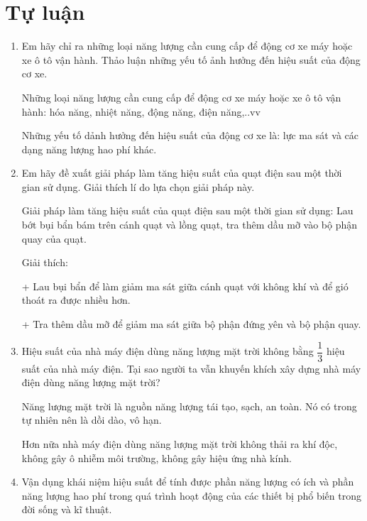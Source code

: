 \section{Tự luận}
\begin{enumerate}[label=\bfseries Câu \arabic*:]
		\item {}
	
	
	{
		Em hãy chỉ ra những loại năng lượng cần cung cấp để động cơ xe máy hoặc xe ô tô vận hành. Thảo luận những yếu tố ảnh hưởng đến hiệu suất của động cơ xe.
	}
	
	\hideall
	{	
		Những loại năng lượng cần cung cấp để động cơ xe máy hoặc xe ô tô vận hành: hóa năng, nhiệt năng, động năng, điện năng,..vv 
		
		Những yếu tố dảnh hưởng đến hiệu suất của động cơ xe là: lực ma sát và các dạng năng lượng hao phí khác.
	}
	\item {}
	
	
	{
		Em hãy đề xuất giải pháp làm tăng hiệu suất của quạt điện sau một thời gian sử dụng. Giải thích lí do lựa chọn giải pháp này.
	}
	
	\hideall
	{	
		Giải pháp làm tăng hiệu suất của quạt điện sau một thời gian sử dụng: Lau bớt bụi bẩn bám trên cánh quạt và lồng quạt, tra thêm dầu mỡ vào bộ phận quay của quạt.
		
		Giải thích:
		
		+ Lau bụi bẩn để làm giảm ma sát giữa cánh quạt với không khí và để gió thoát ra được nhiều hơn.
		
		+ Tra thêm dầu mỡ để giảm ma sát giữa bộ phận đứng yên và bộ phận quay. 
	}
	\item {}
	
	
	{
		Hiệu suất của nhà máy điện dùng năng lượng mặt trời không bằng $\dfrac{1}{3}$ hiệu suất của nhà máy điện. Tại sao người ta vẫn khuyến khích xây dựng nhà máy điện dùng năng lượng mặt trời?
	}
	
	\hideall
	{	
		Năng lượng mặt trời là nguồn năng lượng tái tạo, sạch, an toàn. Nó có trong tự nhiên nên là dồi dào, vô hạn.
		
		Hơn nữa nhà máy điện dùng năng lượng mặt trời không thải ra khí độc, không gây ô nhiễm môi trường, không gây hiệu ứng nhà kính. 
	}
	\item {}
	
	
	{
		Vận dụng khái niệm hiệu suất để tính được phần năng lượng có ích và phần năng lượng hao phí trong quá trình hoạt động của các thiết bị phổ biến trong đời sống và kĩ thuật.
	}
	

\end{enumerate}
